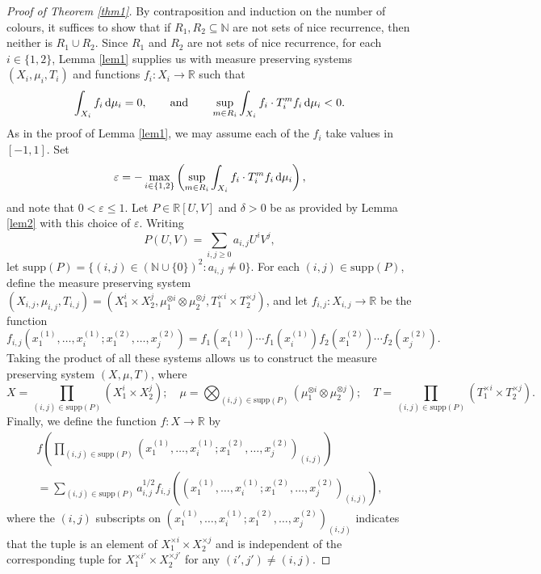 \documentclass[reqno,a4paper,12pt]{amsart}
\theoremstyle{definition}
\theoremstyle{remark}
\def\d{{\,{\rm d}}}
\def \N {\mathbb{N}}
\def \R {\mathbb{R}}
\def\eps{\varepsilon}
\def\supp{\mathrm{supp}}
\begin{document}
\begin{proof}[Proof of Theorem \ref{thm1}]
    By contraposition and induction on the number of colours, it suffices to show that if $R_1,R_2\subseteq\N$ are not sets of nice recurrence, then neither is $R_1\cup R_2$. Since $R_1$ and $R_2$ are not sets of nice recurrence, for each $i\in\{1,2\}$, Lemma \ref{lem1} supplies us with measure preserving systems $(X_i,\mu_i,T_i)$ and functions $f_i:X_i\to\R$ such that 
    \begin{equation*}
        \int_{X_i} f_i \d\mu_i = 0, \qquad\text{and}\qquad \sup_{m\in R_i}\int_{X_i} f_i\cdot T_i^m f_i \d\mu_i < 0.
    \end{equation*}
    As in the proof of Lemma \ref{lem1}, we may assume each of the $f_i$ take values in $[-1,1]$. Set
    \begin{equation*}
        \eps = -\max_{i\in\{1,2\}}\left(\sup_{m\in R_i}\int_{X_i} f_i\cdot T_i^m f_i \d\mu_i\right),
    \end{equation*}
    and note that $0<\eps\leqslant 1$. Let $P\in\R[U,V]$ and $\delta > 0$ be as provided by Lemma \ref{lem2} with this choice of $\eps$. Writing
    \begin{equation*}
        P(U,V) = \sum_{i,j\geqslant 0}a_{i,j}U^iV^j,
    \end{equation*}
    let $\supp(P) = \{(i,j)\in(\N\cup\{0\})^2 : a_{i,j}\neq 0\}$. For each $(i,j)\in\supp(P)$, define the measure preserving system $(X_{i,j},\mu_{i,j},T_{i,j}) = (X_1^{i}\times X_2^j,\mu_1^{\otimes i}\otimes\mu_2^{\otimes j}, T_{1}^{\times i}\times T_2^{\times j})$, and let $f_{i,j}:X_{i,j}\to\R$ be the function
    \begin{equation*}
        f_{i,j}(x_1^{(1)},\ldots,x_i^{(1)};x_1^{(2)},\ldots,x_j^{(2)}) = f_1(x_1^{(1)})\cdots f_1(x_i^{(1)})f_2(x_1^{(2)})\cdots f_2(x_j^{(2)}).
    \end{equation*}
    Taking the product of all these systems allows us to construct the measure preserving system $(X,\mu,T)$, where
    \begin{equation*}
       X= \prod_{(i,j)\in\supp(P)} (X_1^i\times X_2^j);\quad \mu = \bigotimes_{(i,j)\in\supp(P)} (\mu_1^{\otimes i}\otimes\mu_2^{\otimes j}); \quad T =\prod_{(i,j)\in\supp(P)} (T_1^{\times i}\times T_2^{\times j}).
    \end{equation*}
    Finally, we define the function $f:X\to\R$ by
    \begin{align*}
        f\left( \prod_{(i,j)\in\supp(P)} (x_1^{(1)},\ldots,x_i^{(1)};x_1^{(2)},\ldots,x_j^{(2)})_{(i,j)}\right) \\= \sum_{(i,j)\in\supp(P)}a_{i,j}^{1/2}f_{i,j}\left((x_1^{(1)},\ldots,x_i^{(1)};x_1^{(2)},\ldots,x_j^{(2)})_{(i,j)}\right),
    \end{align*}
    where the $(i,j)$ subscripts on $(x_1^{(1)},\ldots,x_i^{(1)};x_1^{(2)},\ldots,x_j^{(2)})_{(i,j)}$ indicates that the tuple is an element of $X_1^{\times i}\times X_2^{\times j}$ and is independent of the corresponding tuple for $X_1^{\times i'}\times X_2^{\times j'}$ for any $(i',j')\neq (i,j)$.


\end{proof}
\end{document}
